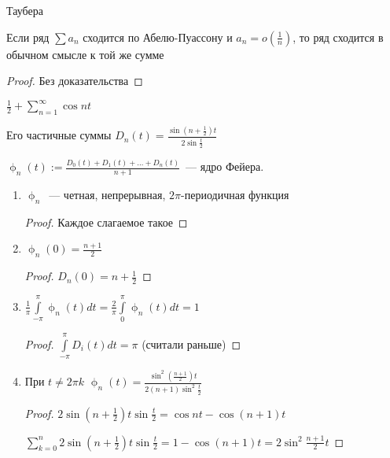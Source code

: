 \begin{theorem} Таубера

    Если ряд $\sum a_n$ сходится по Абелю-Пуассону и $a_n = o(\frac{1}{n})$, то ряд сходится в обычном смысле к той же сумме
\end{theorem}

\begin{proof}
    Без доказательства
\end{proof}

\begin{example}
    $\frac{1}{2} + \sum\limits_{n = 1}^\infty \cos nt$

    Его частичные суммы $D_n(t) = \frac{\sin(n + \frac{1}{2})t}{2\sin\frac{t}{2}}$

    $\upphi_n(t) := \frac{D_0(t) + D_1(t) + \ldots + D_n(t)}{n  + 1}$~--- ядро Фейера.

    \begin{properties}
        \leavevmode
        \begin{enumerate}
            \item $\upphi_n$~--- четная, непрерывная, $2\pi$-периодичная функция
                  \begin{proof}
                      Каждое слагаемое такое
                  \end{proof}
            \item $\upphi_n(0) = \frac{n + 1}{2}$
                  \begin{proof}
                      $D_n(0) = n + \frac{1}{2}$
                  \end{proof}
            \item $\frac{1}{\pi}\int\limits_{-\pi}^\pi \upphi_n(t)dt = \frac{2}{\pi}\int\limits_0^{\pi}\upphi_n(t)dt = 1$
                  \begin{proof}
                      $\int\limits_{-\pi}^{\pi}D_i(t)dt = \pi$ (считали раньше)
                  \end{proof}
            \item При $t \neq 2\pi k$ $\upphi_n(t) = \frac{\sin^2(\frac{n +1}{2}) t}{2(n+1)\sin^2\frac{t}{2}}$
                  \begin{proof}
                      $2\sin(n + \frac{1}{2})t \sin\frac{t}{2} = \cos nt - \cos (n+1)t$
                      
                      $\sum\limits_{k = 0}^n2\sin(n + \frac{1}{2})t\sin \frac{t}{2} = 1 - \cos(n+1)t = 2\sin^2\frac{n +1}{2}t$
                      

\end{proof}
\end{enumerate}
\end{properties}
\end{example}
